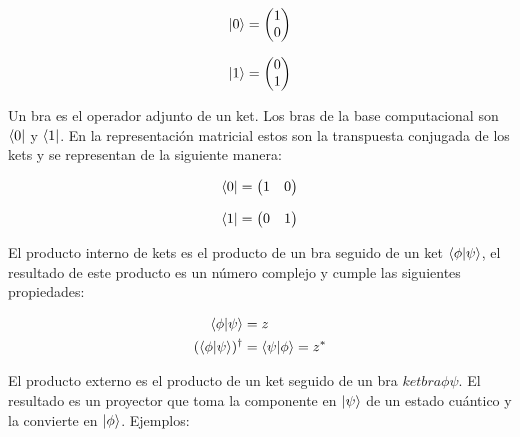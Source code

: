\[\ket{0} = \begin{pmatrix} 1 \\ 0 \end{pmatrix}\]

\[\ket{1} = \begin{pmatrix} 0 \\ 1 \end{pmatrix}\]

Un bra es el operador adjunto de un ket. Los bras de la base computacional son $\bra{0}$ y $\bra{1}$. En la representación matricial estos son la transpuesta conjugada de los kets y se representan de la siguiente manera:

\[\bra{0} = \begin{pmatrix} 1 & 0 \end{pmatrix}\]

\[\bra{1} = \begin{pmatrix} 0 & 1 \end{pmatrix}\]

El producto interno de kets es el producto de un bra seguido de un ket $\braket{\phi}{\psi}$, el resultado de este producto es un número complejo y cumple las siguientes propiedades:

\begin{align}
    \braket{\phi}{\psi} &= z \\
    (\braket{\phi}{\psi})^\dagger &= \braket{\psi}{\phi} = z^*
\end{align}

El producto externo es el producto de un ket seguido de un bra $ketbra{\phi}{\psi}$. El resultado es un proyector que toma la componente en $\ket{\psi}$ de un estado cuántico y la convierte en $\ket{\phi}$. Ejemplos:

